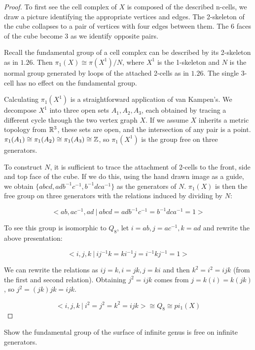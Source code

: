 \documentclass[10pt]{article}
\begin{document}
\begin{proof}

	To first see the cell complex of $X$ is composed of the described n-cells, we
	draw a picture identifying the appropriate vertices and edges. The 2-skeleton
	of the cube collapses to a pair of vertices with four edges between them. The
	6 faces of the cube become 3 as we identify opposite pairs.

	Recall the fundamental group of a cell complex can be described by its
	2-skeleton as in $1.26$. Then $\pi_1(X) \cong \pi(X^1) / N$, where $X^1$
	is the 1-skeleton and $N$ is the normal group generated by loops of the
	attached 2-cells as in $1.26$. The single 3-cell has no effect on the
	fundamental group.

	Calculating $\pi_1(X^1)$ is a straightforward application of van Kampen's. We
	decompose $X^1$ into three open sets $A_1, A_2, A_3$, each obtained by tracing
	a different cycle through the two vertex graph $X$. If we assume $X$ inherits
	a metric topology from $\mathbb{R}^3$, these sets are open, and the intersection of
	any pair is a point. $\pi_1(A_1) \cong \pi_1(A_2) \cong \pi_1(A_3) \cong \mathbb{Z}$,
	so $\pi_1(X^1)$ is the group free on three generators.

	To construct $N$, it is sufficient to trace the attachment of 2-cells to the
	front, side and top face of the cube. If we do this, using the hand drawn
	image as a guide, we obtain $\{ abcd, adb^{-1}c^{-1}, b^{-1}dca^{-1} \}$ as
	the generators of $N$. $\pi_1(X)$ is then the free group on three generators
	with the relations induced by dividing by $N$:

	\[<ab, ac^{-1}, ad ~|~ abcd=adb^{-1}c^{-1}=b^{-1}dca^{-1}=1 >\]

	To see this group is isomorphic to $Q_8$, let $i=ab, j=ac^{-1}, k=ad$ and
	rewrite the above presentation:

	\[<i, j, k ~|~ ij^{-1}k=ki^{-1}j=i^{-1}kj^{-1}=1>\]

	We can rewrite the relations as $ij = k, i = jk, j = ki$ and then $k^2 = i^2
	= ijk$ (from the first and second relation). Obtaining $j^2 = ijk$ comes from
	$j = k(i) = k(jk)$, so $j^2 = (jk)jk = ijk$.

	\[<i, j, k ~|~ i^2=j^2=k^2=ijk> \cong Q_8 \cong pi_1(X) \]

\end{proof}

\begin{exercise}
	Show the fundamental group of the surface of infinite genus is free on
	infinite generators.
\end{exercise}
\end{document}
